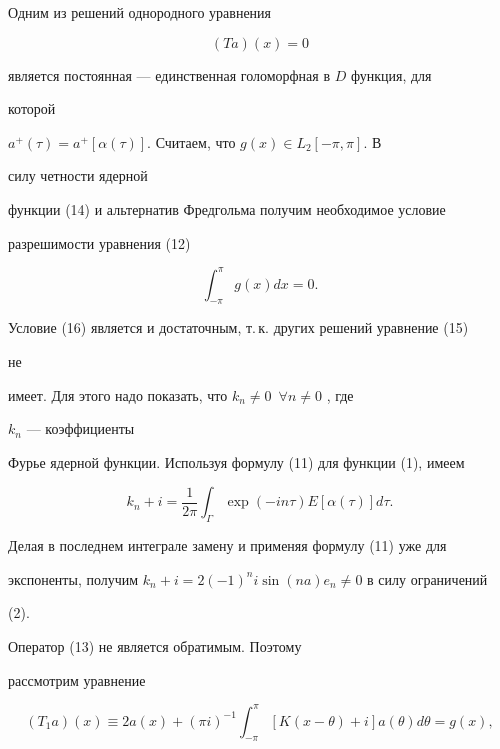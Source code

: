 Одним из решений однородного уравнения 


\begin{equation} 


(T a)(x)=0 


\end{equation} 


является постоянная --- единственная голоморфная в $D$ функция, для 


которой  


$a^+(\tau)=a^+[\alpha(\tau)]$. Считаем, что $g(x)\in L_2[-\pi,\pi]$. В 


силу четности ядерной 


функции (14) и альтернатив Фредгольма получим необходимое условие  


разрешимости уравнения (12) 


\begin{equation} 


\int^\pi_{-\pi}g(x)d x=0. 


\end{equation} 


Условие (16) является и достаточным, т.\,к. других решений уравнение (15) 


не 


имеет. Для этого надо показать, что $k_n\ne0$\, $\forall n\ne0$ , где 


$k_n$ --- коэффициенты 


Фурье ядерной функции. Используя формулу (11) для функции (1), имеем 


$$ 


k_n+i=\frac{1}{2\pi}\int_\Gamma\exp 


(-in\tau)E[\alpha(\tau)]d\tau. 


$$ 


Делая в последнем интеграле замену и применяя формулу (11) уже для  


экспоненты, получим $k_n+i=2(-1)^n i\sin(n a)e_n\ne0$ в силу ограничений 


(2). 


 


Оператор (13) не является обратимым. Поэтому 


рассмотрим уравнение 


\begin{equation} 


(T_1a)(x)\equiv2a(x)+(\pi i)^{-1}\int^\pi_{-\pi} 


[K(x-\theta)+i]a(\theta)d\theta=g(x), 


\end{equation} 


